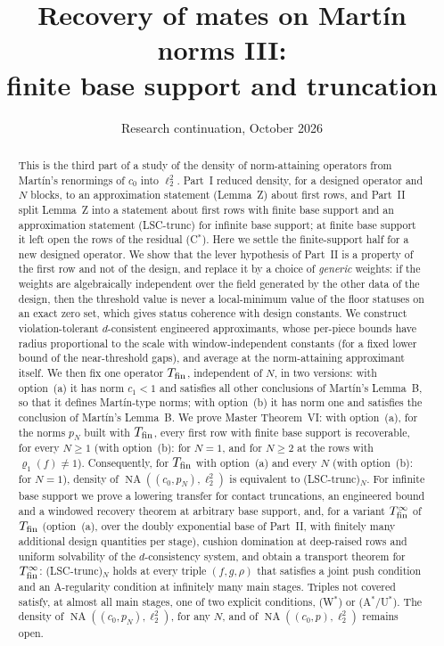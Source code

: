 \documentclass[10pt]{amsart}
\title[Recovery of mates on Mart\'in norms III]{Recovery of mates on Mart\'in norms III:\\finite base support and truncation}
\author{}
\date{Research continuation, October 2026}
\theoremstyle{definition}
\theoremstyle{remark}
\newcommand{\NA}{\operatorname{NA}}
\begin{document}
\begin{abstract}
This is the third part of a study of the density of norm-attaining
operators from Mart\'in's renormings of $c_0$ into $\ell_2^2$.  Part~I
reduced density, for a designed operator and $N$ blocks, to an
approximation statement (Lemma~Z) about first rows, and Part~II split
Lemma~Z into a statement about first rows with finite base support and an
approximation statement (LSC-trunc) for infinite base support; at finite
base support it left open the rows of the residual (C$^*$).  Here we settle
the finite-support half for a new designed operator.  We show that the lever hypothesis of Part~II is a property
of the first row and not of the design, and replace it by a choice of
\emph{generic} weights: if the weights are algebraically independent over
the field generated by the other data of the design, then the threshold
value is never a local-minimum value of the floor statuses on an exact zero
set, which gives status coherence with design constants.  We construct
violation-tolerant $d$-consistent engineered approximants, whose per-piece
bounds have radius proportional to the scale with window-independent
constants (for a fixed lower bound of the near-threshold gaps), and average
at the norm-attaining approximant itself.  We then fix one operator
$T_{\rm fin}$, independent of $N$, in two versions: with option~(a) it has
norm $c_1<1$ and satisfies all other conclusions of Mart\'in's Lemma~B, so
that it defines Mart\'in-type norms; with option~(b) it has norm one and
satisfies the conclusion of Mart\'in's Lemma~B.  We prove Master
Theorem~VI: with option~(a), for the norms $p_N$ built with $T_{\rm fin}$,
every first row with finite base support is recoverable, for every
$N\ge1$ (with option~(b): for $N=1$, and for $N\ge2$ at the rows with
$\varrho_1(f)\ne1$).  Consequently, for $T_{\rm fin}$ with option~(a) and
every $N$ (with option~(b): for $N=1$), density of
$\NA((c_0,p_N),\ell_2^2)$ is equivalent to (LSC-trunc)$_N$.  For infinite
base support we prove a lowering transfer for contact truncations, an
engineered bound and a windowed recovery theorem at arbitrary base
support, and, for a variant $T^\infty_{\rm fin}$ of $T_{\rm fin}$
(option~(a), over the doubly exponential base of Part~II, with finitely
many additional design quantities per stage), cushion domination at
deep-raised rows and uniform solvability of the $d$-consistency system,
and obtain a transport theorem for $T^\infty_{\rm fin}$: (LSC-trunc)$_N$ holds at every triple
$(f,g,\rho)$ that satisfies a joint push condition and an A-regularity
condition at infinitely many main stages.  Triples not covered satisfy, at
almost all main stages, one of two explicit conditions, (W$^*$)
or (A$^*$/U$^*$).  The density of $\NA((c_0,p_N),\ell_2^2)$, for any $N$,
and of $\NA((c_0,p),\ell_2^2)$ remains open.
\end{abstract}
\maketitle
\tableofcontents
\end{document}
